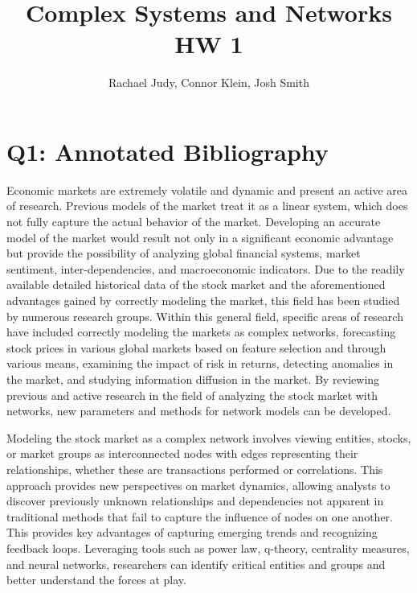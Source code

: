 \documentclass[12pt]{article}
\title{Complex Systems and Networks HW 1}
\author{Rachael Judy, Connor Klein, Josh Smith}
\begin{document}
\pgfplotsset{compat=1.18}
 
\maketitle

\section{Q1: Annotated Bibliography}

Economic markets are extremely volatile and dynamic and present an active area of research. Previous models of the market treat it as a linear system, which does not fully capture the actual behavior of the market. Developing an accurate model of the market would result not only in a significant economic advantage but provide the possibility of analyzing global financial systems, market sentiment, inter-dependencies, and macroeconomic indicators. Due to the readily available detailed historical data of the stock market and the aforementioned advantages gained by correctly modeling the market, this field has been studied by numerous research groups. Within this general field, specific areas of research have included correctly modeling the markets as complex networks, forecasting stock prices in various global markets based on feature selection and through various means, examining the impact of risk in returns, detecting anomalies in the market, and studying information diffusion in the market. By reviewing previous and active research in the field of analyzing the stock market with networks, new parameters and methods for network models can be developed.


Modeling the stock market as a complex network involves viewing entities, stocks, or market groups as interconnected nodes with edges representing their relationships, whether these are transactions performed or correlations. This approach provides new perspectives on market dynamics, allowing analysts to discover previously unknown relationships and dependencies not apparent in traditional methods that fail to capture the influence of nodes on one another. This provides key advantages of capturing emerging trends and recognizing feedback loops. Leveraging tools such as power law, q-theory, centrality measures, and neural networks, researchers can identify critical entities and groups and better understand the forces at play.
\end{document}
